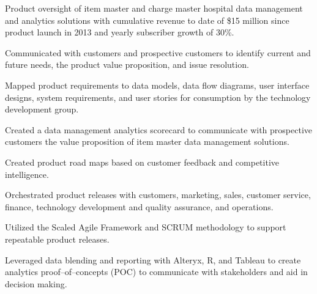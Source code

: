 \documentclass{article}
\newcommand{\sbt}{\,\begin{picture}(-1,1)(-1,-3)\circle*{3}\end{picture}\ }
\begin{document}
\begin{compactitem}

\item[\sbt] Product oversight of item master and charge master hospital data management and analytics solutions with cumulative revenue to date of \$15 million since product launch in 2013 and yearly subscriber growth of 30\%.
\item[\sbt] Communicated with customers and prospective customers to identify current and future needs, the product value proposition, and issue resolution.
\item[\sbt] Mapped product requirements to data models, data flow diagrams, user interface designs, system requirements, and user stories for consumption by the technology development group.
\item[\sbt] Created a data management analytics scorecard to communicate with prospective customers the value proposition of item master data management solutions.
\item[\sbt] Created product road maps based on customer feedback and competitive intelligence.
\item[\sbt] Orchestrated product releases with customers, marketing, sales, customer service, finance, technology development and quality assurance, and operations.
\item[\sbt] Utilized the Scaled Agile Framework and SCRUM methodology to support repeatable product releases.
\item[\sbt] Leveraged data blending and reporting with Alteryx, R, and Tableau to create analytics proof--of--concepts (POC) to communicate with stakeholders and aid in decision making.

\end{compactitem}

\clearpage
\end{document}

